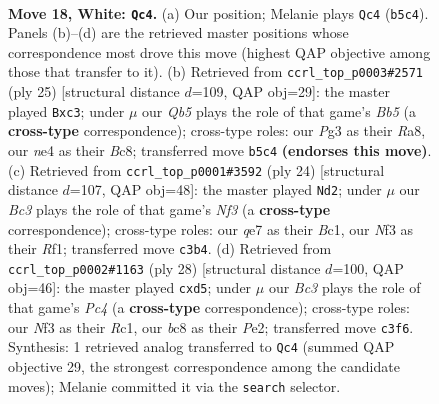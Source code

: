 \documentclass[11pt]{article}
\begin{document}
\clearpage

\begin{figure}[p]\centering
\begin{subfigure}{0.46\textwidth}\centering
\resizebox{\linewidth}{!}{%
\newchessgame
\chessboard[
  setfen={1rb2r2/p1ppqp2/2n1p2k/1QP3pp/4n3/2B2NP1/PP2PP1P/R3KB1R w - - 3 18},
  showmover=false,
  pgfstyle=straightmove, color=movearrow, markmove={b5-c4}
]}
\caption{}
\end{subfigure}\hfill
\begin{subfigure}{0.46\textwidth}\centering
\resizebox{\linewidth}{!}{%
\newchessgame
\chessboard[
  setfen={r1b2rk1/ppq2ppp/P1p2n2/4p1N1/1bP1P3/2N4P/1PP2PP1/R1BQ1RK1 b - - 0 13},
  showmover=false,
  pgfstyle=straightmove, color=movearrow, markmove={b4-c3}
]}
\caption{}
\end{subfigure}
\\[4pt]
\begin{subfigure}{0.46\textwidth}\centering
\resizebox{\linewidth}{!}{%
\newchessgame
\chessboard[
  setfen={r1bq1rk1/pp4pp/2n5/2p1pp2/2P1n3/P2Q1NP1/1P2PPBP/R1B2RK1 w - - 0 13},
  showmover=false,
  pgfstyle=straightmove, color=movearrow, markmove={f3-d2}
]}
\caption{}
\end{subfigure}\hfill
\begin{subfigure}{0.46\textwidth}\centering
\resizebox{\linewidth}{!}{%
\newchessgame
\chessboard[
  setfen={r1bq1rk1/p5pp/1p2pp2/n2pN3/2PPn3/3QB1P1/P3PPBP/R1R3K1 w - - 0 15},
  showmover=false,
  pgfstyle=straightmove, color=movearrow, markmove={c4-d5}
]}
\caption{}
\end{subfigure}
\caption{\textbf{Move 18, White: \texttt{Qc4}.} (a) Our position; Melanie plays \texttt{Qc4} (\texttt{b5c4}). Panels (b)--(d) are the retrieved master positions whose correspondence most drove this move (highest QAP objective among those that transfer to it). (b) Retrieved from \texttt{ccrl\_top\_p0003\#2571} (ply 25) [structural distance $d$=109, QAP obj=29]: the master played \texttt{Bxc3}; under $\mu$ our \emph{Qb5} plays the role of that game's \emph{Bb5} (a \textbf{cross-type} correspondence); cross-type roles: our \emph{P}g3 as their \emph{R}a8, our \emph{n}e4 as their \emph{B}c8; transferred move \texttt{b5c4} \textbf{(endorses this move)}. (c) Retrieved from \texttt{ccrl\_top\_p0001\#3592} (ply 24) [structural distance $d$=107, QAP obj=48]: the master played \texttt{Nd2}; under $\mu$ our \emph{Bc3} plays the role of that game's \emph{Nf3} (a \textbf{cross-type} correspondence); cross-type roles: our \emph{q}e7 as their \emph{B}c1, our \emph{N}f3 as their \emph{R}f1; transferred move \texttt{c3b4}. (d) Retrieved from \texttt{ccrl\_top\_p0002\#1163} (ply 28) [structural distance $d$=100, QAP obj=46]: the master played \texttt{cxd5}; under $\mu$ our \emph{Bc3} plays the role of that game's \emph{Pc4} (a \textbf{cross-type} correspondence); cross-type roles: our \emph{N}f3 as their \emph{R}c1, our \emph{b}c8 as their \emph{P}e2; transferred move \texttt{c3f6}. Synthesis: 1 retrieved analog transferred to \texttt{Qc4} (summed QAP objective 29, the strongest correspondence among the candidate moves); Melanie committed it via the \texttt{search} selector.}
\label{fig:thought-m34}
\end{figure}
\end{document}
